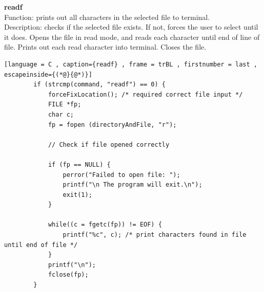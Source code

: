 \documentclass[a4paper]{article}
\theoremstyle{plain}
\theoremstyle{definition}
\theoremstyle{remark}
\begin{document}
\textbf{readf}\\
Function: prints out all characters in the selected file to terminal. \\
Description: checks if the selected file exists. If not, forces the user to select until it does. Opens the file in read mode, and reads each character until end of line of file. Prints out each read character into terminal. Closes the file. \\
\begin{lstlisting}[language = C , caption={readf} , frame = trBL , firstnumber = last , escapeinside={(*@}{@*)}]
		if (strcmp(command, "readf") == 0) {
			forceFixLocation(); /* required correct file input */
			FILE *fp; 
			char c; 
   			fp = fopen (directoryAndFile, "r");
			
			// Check if file opened correctly

			if (fp == NULL) {
    			perror("Failed to open file: ");
    			printf("\n The program will exit.\n");
    			exit(1);
			}

			while((c = fgetc(fp)) != EOF) {
				printf("%c", c); /* print characters found in file until end of file */
			}
			printf("\n");
			fclose(fp);
		}
\end{lstlisting}
\end{document}
